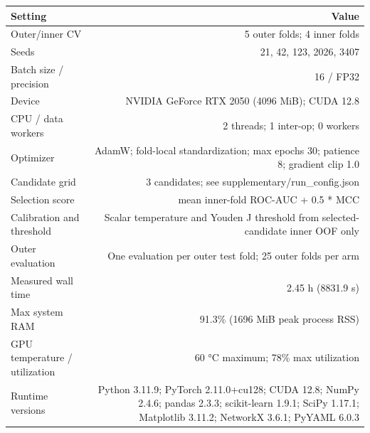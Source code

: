 \begin{tabular}{lr}
\toprule
Setting & Value \\
\midrule
Outer/inner CV & 5 outer folds; 4 inner folds \\
Seeds & 21, 42, 123, 2026, 3407 \\
Batch size / precision & 16 / FP32 \\
Device & NVIDIA GeForce RTX 2050 (4096 MiB); CUDA 12.8 \\
CPU / data workers & 2 threads; 1 inter-op; 0 workers \\
Optimizer & AdamW; fold-local standardization; max epochs 30; patience 8; gradient clip 1.0 \\
Candidate grid & 3 candidates; see supplementary/run\_config.json \\
Selection score & mean inner-fold ROC-AUC + 0.5 * MCC \\
Calibration and threshold & Scalar temperature and Youden J threshold from selected-candidate inner OOF only \\
Outer evaluation & One evaluation per outer test fold; 25 outer folds per arm \\
Measured wall time & 2.45 h (8831.9 s) \\
Max system RAM & 91.3\% (1696 MiB peak process RSS) \\
GPU temperature / utilization & 60 °C maximum; 78\% max utilization \\
Runtime versions & Python 3.11.9; PyTorch 2.11.0+cu128; CUDA 12.8; NumPy 2.4.6; pandas 2.3.3; scikit-learn 1.9.1; SciPy 1.17.1; Matplotlib 3.11.2; NetworkX 3.6.1; PyYAML 6.0.3 \\
\bottomrule
\end{tabular}
